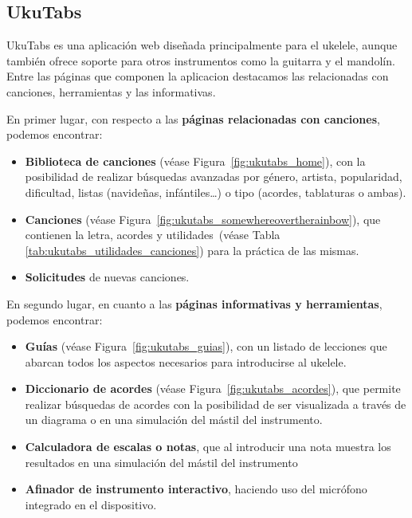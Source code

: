 \subsection{UkuTabs}

UkuTabs\cite{ukuleletabs_home} es una aplicación web diseñada principalmente para el ukelele, aunque también ofrece soporte para otros instrumentos como la guitarra y el mandolín. Entre las páginas que componen la aplicacion destacamos las relacionadas con canciones, herramientas y las informativas.

En primer lugar, con respecto a las \textbf{páginas relacionadas con canciones}, podemos encontrar:

\begin{itemize}
    \item \textbf{Biblioteca de canciones} (véase Figura~\ref{fig:ukutabs_home}), con la posibilidad de realizar búsquedas avanzadas por género, artista, popularidad, dificultad, listas (navideñas, infántiles\ldots) o tipo (acordes, tablaturas o ambas).
    \item \textbf{Canciones} (véase Figura~\ref{fig:ukutabs_somewhereovertherainbow}), que contienen la letra, acordes y utilidades~(véase Tabla \ref{tab:ukutabs_utilidades_canciones}) para la práctica de las mismas.
    \item \textbf{Solicitudes} de nuevas canciones.
\end{itemize}

En segundo lugar, en cuanto a las \textbf{páginas informativas y herramientas}, podemos encontrar:
\begin{itemize}
    \item \textbf{Guías} (véase Figura~\ref{fig:ukutabs_guias}), con un listado de lecciones que abarcan todos los aspectos necesarios para introducirse al ukelele.
    \item \textbf{Diccionario de acordes} (véase Figura~\ref{fig:ukutabs_acordes}), que permite realizar búsquedas de acordes con la posibilidad de ser visualizada a través de un diagrama o en una simulación del mástil del instrumento.
    \item \textbf{Calculadora de escalas o notas}, que al introducir una nota muestra los resultados en una simulación del mástil del instrumento
    \item \textbf{Afinador de instrumento interactivo}, haciendo uso del micrófono integrado en el dispositivo.
\end{itemize}


